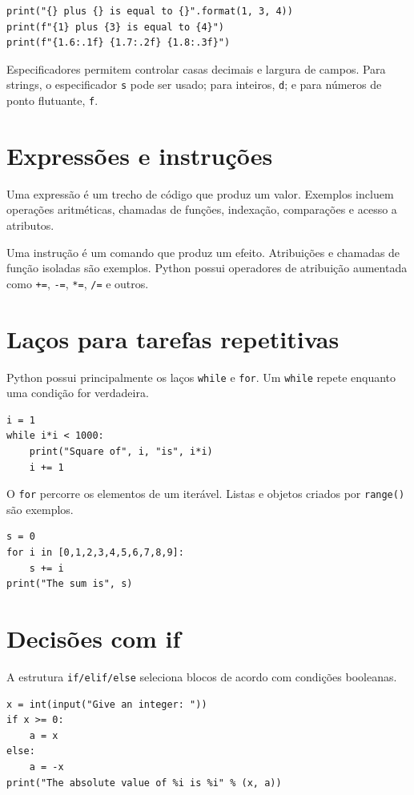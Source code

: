 \documentclass[11pt,a4paper]{article}
\begin{document}
\begin{lstlisting}
print("{} plus {} is equal to {}".format(1, 3, 4))
print(f"{1} plus {3} is equal to {4}")
print(f"{1.6:.1f} {1.7:.2f} {1.8:.3f}")
\end{lstlisting}

Especificadores permitem controlar casas decimais e largura de campos. Para strings, o especificador \texttt{s} pode ser usado; para inteiros, \texttt{d}; e para números de ponto flutuante, \texttt{f}.

\section{Expressões e instruções}
Uma expressão é um trecho de código que produz um valor. Exemplos incluem operações aritméticas, chamadas de funções, indexação, comparações e acesso a atributos.

Uma instrução é um comando que produz um efeito. Atribuições e chamadas de função isoladas são exemplos. Python possui operadores de atribuição aumentada como \texttt{+=}, \texttt{-=}, \texttt{*=}, \texttt{/=} e outros.

\section{Laços para tarefas repetitivas}
Python possui principalmente os laços \texttt{while} e \texttt{for}. Um \texttt{while} repete enquanto uma condição for verdadeira.

\begin{lstlisting}
i = 1
while i*i < 1000:
    print("Square of", i, "is", i*i)
    i += 1
\end{lstlisting}

O \texttt{for} percorre os elementos de um iterável. Listas e objetos criados por \texttt{range()} são exemplos.

\begin{lstlisting}
s = 0
for i in [0,1,2,3,4,5,6,7,8,9]:
    s += i
print("The sum is", s)
\end{lstlisting}

\section{Decisões com if}
A estrutura \texttt{if/elif/else} seleciona blocos de acordo com condições booleanas.

\begin{lstlisting}
x = int(input("Give an integer: "))
if x >= 0:
    a = x
else:
    a = -x
print("The absolute value of %i is %i" % (x, a))
\end{lstlisting}
\end{document}
